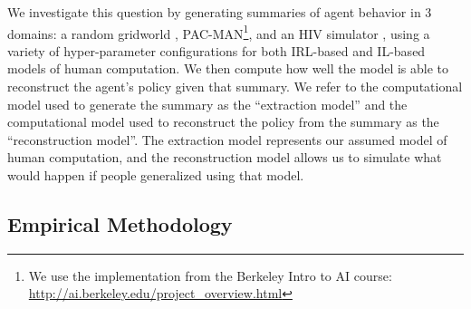 \documentclass{article}
\begin{document}
We investigate this question by generating summaries of agent behavior in 3 domains: a random gridworld \cite{brown2018machineteachingirl}, PAC-MAN\footnote{We use the implementation from the Berkeley Intro to AI course: \url{http://ai.berkeley.edu/project_overview.html}}, and an HIV simulator \cite{adams2005hiv}, using a variety of hyper-parameter configurations for both IRL-based and IL-based models of human computation. We then compute how well the model is able to reconstruct the agent's policy given that summary. We refer to the computational model used to generate the summary as the ``extraction model'' and the computational model used to reconstruct the policy from the summary as the ``reconstruction model''. The extraction model represents our assumed model of human computation, and the reconstruction model allows us to simulate what would happen if people generalized using that model.

\subsection{Empirical Methodology}
\end{document}
